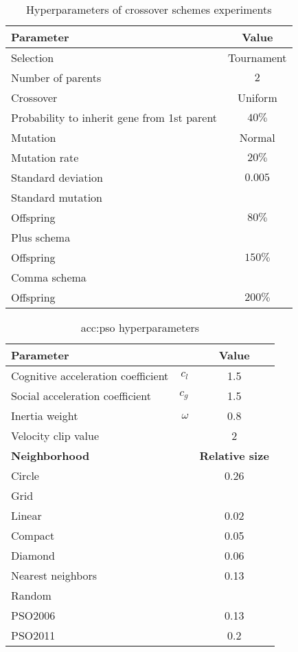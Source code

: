 \begin{table}[ht]
    \centering
    \begin{tabular}{|l|c|}
        \hline
        \textbf{Parameter} & \textbf{Value} \\
        \hline
        Selection & Tournament \\
        \quad Number of parents & $2$ \\
        Crossover & Uniform \\
        \quad Probability to inherit gene from 1st parent & $40\%$ \\
        Mutation & Normal \\
        \quad Mutation rate & $20\%$ \\
        \quad Standard deviation & $0.005$ \\
        \hline
        Standard mutation & \\
        \quad Offspring & $80\%$ \\
        Plus schema & \\
        \quad Offspring & $150\%$ \\
        Comma schema & \\
        \quad Offspring & $200\%$ \\
        \hline
    \end{tabular}
    \caption{Hyperparameters of crossover schemes experiments}
    \label{tab:esschemehyperparmarameters}
\end{table}

\begin{table}[ht]
    \centering
    \begin{tabular}{|l r|c|}
        \hline
        \multicolumn{2}{|l|}{\textbf{Parameter}} & \textbf{Value} \\
        \hline
        Cognitive acceleration coefficient & $c_l$ & 1.5 \\
        Social acceleration coefficient  & $c_g$ & 1.5 \\
        Inertia weight & $\omega$ & 0.8 \\
        Velocity clip value & & 2 \\
        \hline \hline
        \textbf{Neighborhood} & & \textbf{Relative size} \\
        \hline
        Circle & & 0.26 \\
        Grid & & \\
        \quad Linear & & 0.02 \\
        \quad Compact & & 0.05 \\
        \quad Diamond & & 0.06 \\
        Nearest neighbors & & 0.13 \\
        Random & & \\
        \quad PSO2006 & & 0.13 \\
        \quad PSO2011 & & 0.2 \\ 
        \hline
    \end{tabular}
    \caption{\acrlong*{acc:pso} hyperparameters}
    \label{tab:psohyperparameters}
\end{table}